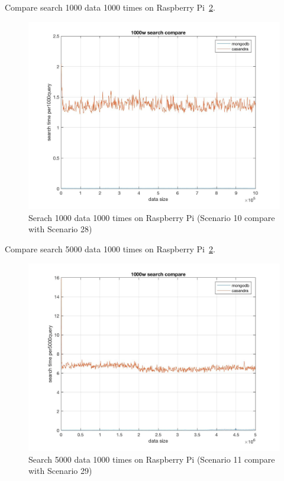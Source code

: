 Compare search 1000 data 1000 times on Raspberry Pi~\ref{f:fly}.

\begin{figure}[!ht]
  \centering\includegraphics[width=\columnwidth]
  {images/search_comp_1000_pi.jpg}
  \caption{Serach 1000 data 1000 times on Raspberry Pi
   (Scenario 10 compare with Scenario 28) }\label{f:fly}
\end{figure}

Compare search 5000 data 1000 times on Raspberry Pi~\ref{f:fly}.

\begin{figure}[!ht]
  \centering\includegraphics[width=\columnwidth]
  {images/search_comp_5000_pi.jpg}
  \caption{Search 5000 data 1000 times on Raspberry Pi
   (Scenario 11 compare with Scenario 29)}\label{f:fly}
\end{figure}


